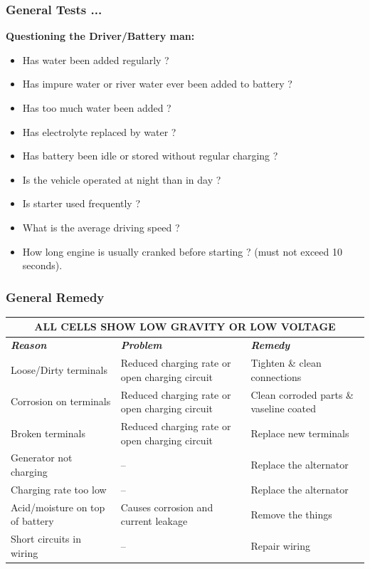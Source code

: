 \documentclass{beamer}
\begin{document}
\begin{frame}
  \frametitle{General Tests ...}
  \fontsize{8pt}{12}\selectfont
  
  \textbf{Questioning the Driver/Battery man:}
  
  \bigskip
  \begin{itemize}
    \item Has water been added regularly ?
    \item Has impure water or river water ever been added to battery ?
    \item Has too much water been added ?
    \item Has electrolyte replaced by water ?
    \item Has battery been idle or stored without regular charging ?
    \item Is the vehicle operated at night than in day ?
    \item Is starter used frequently ?
    \item What is the average driving speed ?
    \item How long engine is usually cranked before starting ? (must not exceed 10 seconds).
  \end{itemize}
\end{frame}

\begin{frame}
  \frametitle{General Remedy}
  \fontsize{8pt}{10}\selectfont
  \renewcommand{\arraystretch}{1.5}
    \begin{tabularx}{\textwidth}{|X|X|X|}
    \hline
    \multicolumn{3}{|c|}{\textbf{ALL CELLS SHOW LOW GRAVITY OR LOW VOLTAGE}} \\
    \hline
    \textbf{\textit{Reason}} & \textbf{\textit{Problem}} & \textbf{\textit{Remedy}} \\
    \hline
    Loose/Dirty terminals & Reduced charging rate or open charging circuit & Tighten \& clean connections \\ \hline
    Corrosion on terminals & Reduced charging rate or open charging circuit & Clean corroded parts \& vaseline coated \\ \hline
    Broken terminals & Reduced charging rate or open charging circuit & Replace new terminals \\ \hline
    Generator not charging & -- & Replace the alternator \\ \hline
    Charging rate too low & -- & Replace the alternator \\ \hline
    Acid/moisture on top of battery & Causes corrosion and current leakage & Remove the things \\ \hline
    Short circuits in wiring & -- & Repair wiring \\ \hline
    \end{tabularx}
\end{frame}
\end{document}
